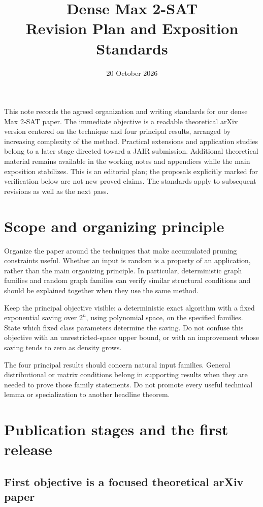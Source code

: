 \documentclass[11pt,a4paper]{article}
\title{Dense Max 2-SAT\\Revision Plan and Exposition Standards}
\author{}
\date{20 October 2026}
\begin{document}
\maketitle

This note records the agreed organization and writing standards for our
dense Max 2-SAT paper. The immediate objective is a readable theoretical
arXiv version centered on the technique and four principal results,
arranged by increasing complexity of the method. Practical extensions
and application studies belong to a later stage directed toward a JAIR
submission. Additional theoretical material remains available in the
working notes and appendices while the main exposition stabilizes.
This is an editorial plan; the
proposals explicitly marked for verification below are not new proved
claims. The standards apply to subsequent revisions as well as the next pass.

\section{Scope and organizing principle}

Organize the paper around the techniques that make accumulated pruning
constraints useful. Whether an input is random is a property of an
application, rather than the main organizing principle. In particular,
deterministic graph families and random graph families can verify similar
structural conditions and should be explained together when they use the
same method.

Keep the principal objective visible: a deterministic exact algorithm with
a fixed exponential saving over $2^n$, using polynomial space, on the
specified families. State which fixed class parameters determine the saving.
Do not confuse this objective with an unrestricted-space upper bound, or
with an improvement whose saving tends to zero as density grows.

The four principal results should concern natural input families. General
distributional or matrix conditions belong in supporting results when they
are needed to prove those family statements. Do not promote every useful
technical lemma or specialization to another headline theorem.

\section{Publication stages and the first release}

\subsection{First objective is a focused theoretical arXiv paper}
\end{document}
